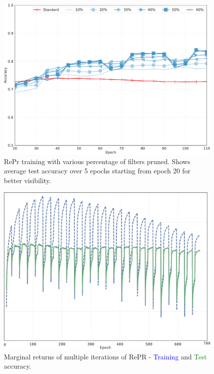 \begin{figure}[H]
\center
    \includegraphics[width=0.8\linewidth]{figures/repr/percentage_pruned_X.pdf}
   \caption{RePr training with various percentage of filters pruned. Shows average test accuracy over 5 epochs starting from epoch 20 for better visibility.}
   \label{fig:ablation_percent}
\end{figure}


\begin{figure}[H]
\center
   \includegraphics[width=0.75\linewidth]{figures/repr/marginal_returns_no_y.pdf}
   \caption{Marginal returns of multiple iterations of RePR - \textcolor{blue}{Training} and \textcolor{green}{Test} accuracy.}
   \label{fig:ablation_N_repeat}
\end{figure}



